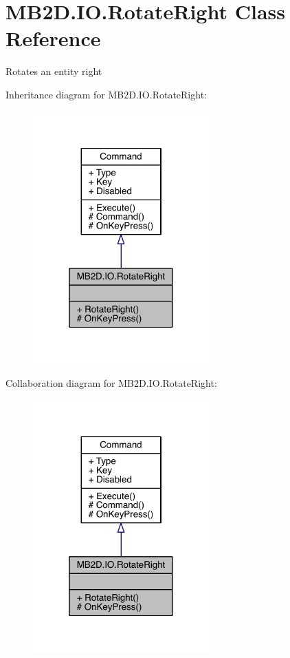 \hypertarget{class_m_b2_d_1_1_i_o_1_1_rotate_right}{}\section{M\+B2\+D.\+I\+O.\+Rotate\+Right Class Reference}
\label{class_m_b2_d_1_1_i_o_1_1_rotate_right}


Rotates an entity right  




Inheritance diagram for M\+B2\+D.\+I\+O.\+Rotate\+Right\+:
\nopagebreak
\begin{figure}[H]
\begin{center}
\leavevmode
\includegraphics[width=193pt]{class_m_b2_d_1_1_i_o_1_1_rotate_right__inherit__graph}
\end{center}
\end{figure}


Collaboration diagram for M\+B2\+D.\+I\+O.\+Rotate\+Right\+:
\nopagebreak
\begin{figure}[H]
\begin{center}
\leavevmode
\includegraphics[width=193pt]{class_m_b2_d_1_1_i_o_1_1_rotate_right__coll__graph}
\end{center}
\end{figure}

